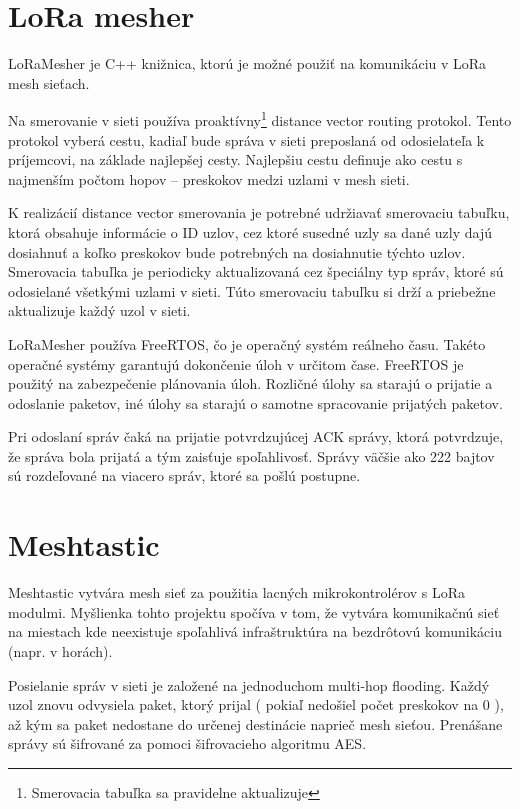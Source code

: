 \documentclass[slovak,master]{diploma}
\begin{document}
\section{LoRa mesher}
LoRaMesher \cite{loramesher} \cite{9930341} je C++ knižnica, ktorú je možné použiť na komunikáciu v LoRa mesh sieťach.

Na smerovanie v sieti používa proaktívny\footnote[1]{Smerovacia tabuľka sa pravidelne aktualizuje}  distance vector routing protokol. Tento protokol vyberá cestu, kadiaľ bude správa v sieti preposlaná od odosielateľa k príjemcovi, na základe 
najlepšej cesty. Najlepšiu cestu definuje ako cestu s najmenším počtom hopov -- preskokov medzi uzlami v mesh sieti.

K realizácií distance vector smerovania je potrebné udržiavať smerovaciu tabuľku, ktorá obsahuje informácie o ID uzlov, cez ktoré susedné uzly sa dané uzly dajú dosiahnuť a 
koľko preskokov bude potrebných na dosiahnutie týchto uzlov. Smerovacia tabuľka je periodicky aktualizovaná cez špeciálny typ správ, ktoré sú odosielané 
všetkými uzlami v sieti. Túto smerovaciu tabuľku si drží a priebežne aktualizuje každý uzol v sieti.

LoRaMesher používa FreeRTOS, čo je operačný systém reálneho času. Takéto operačné systémy garantujú dokončenie úloh v určitom čase.
FreeRTOS je použitý na zabezpečenie plánovania úloh. Rozličné úlohy sa starajú o prijatie a odoslanie paketov, iné úlohy sa starajú o samotne 
spracovanie prijatých paketov.

Pri odoslaní správ čaká na prijatie potvrdzujúcej ACK správy, ktorá potvrdzuje, 
že správa bola prijatá a tým zaisťuje spoľahlivosť. Správy väčšie ako 222 bajtov sú rozdeľované na viacero správ, ktoré sa pošlú postupne.

\section{Meshtastic}
Meshtastic vytvára mesh sieť za použitia lacných mikrokontrolérov s LoRa modulmi.
Myšlienka tohto projektu spočíva v tom, že vytvára komunikačnú sieť na miestach kde neexistuje spoľahlivá infraštruktúra na bezdrôtovú komunikáciu (napr. v horách).

Posielanie správ v sieti je založené na jednoduchom multi-hop flooding.
Každý uzol znovu odvysiela paket, ktorý prijal ( pokiaľ nedošiel počet preskokov na 0 ), až kým sa paket nedostane do určenej destinácie naprieč mesh sieťou.
Prenášane správy sú šifrované za pomoci šifrovacieho algoritmu AES.
\end{document}

